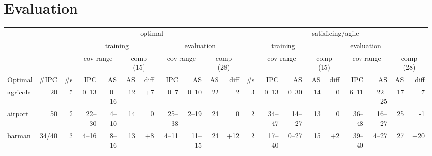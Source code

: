 \documentclass{article}
\begin{document}
        \tableofcontents
        \newpage \section{{Evaluation}}
                        \begin{table}[h] \centering \scriptsize \setlength{\tabcolsep}{2pt}
                        \begin{tabular}{l@{}rr|rrrr|rrrr|r|rrrr|rrrr}
& & \multicolumn{9}{c}{optimal} & \multicolumn{9}{c}{satisficing/agile} \\
\cmidrule[\lightrulewidth](){3-11}
\cmidrule[\lightrulewidth](l){12-20}
& & & \multicolumn{4}{c}{training} & \multicolumn{4}{c}{evaluation} & \multicolumn{4}{c}{training} & \multicolumn{4}{c}{evaluation}\\
\cmidrule[\lightrulewidth](){4-7}
\cmidrule[\lightrulewidth](l){8-11}
\cmidrule[\lightrulewidth](){13-16}
\cmidrule[\lightrulewidth](l){17-20}
& & & \multicolumn{2}{c}{cov range} & \multicolumn{2}{c}{comp (15)} & \multicolumn{2}{c}{cov range} & \multicolumn{2}{c}{comp (28)} & & \multicolumn{2}{c}{cov range} & \multicolumn{2}{c}{comp (15)} & \multicolumn{2}{c}{cov range} & \multicolumn{2}{c}{comp (28)} \\
\cmidrule[\lightrulewidth](){4-5}
\cmidrule[\lightrulewidth](l){6-7}
\cmidrule[\lightrulewidth](l){8-9}
\cmidrule[\lightrulewidth](l){10-11}
\cmidrule[\lightrulewidth](){13-14}
\cmidrule[\lightrulewidth](l){15-16}
\cmidrule[\lightrulewidth](l){17-18}
       Optimal &  \#IPC & \#s &      IPC &      AS &  AS &              diff &      IPC &      AS &  AS &               diff & \#s &       IPC &      AS &  AS &               diff &       IPC &      AS &  AS &               diff \\
\midrule
      agricola &     20 &   5 &    0--13 &   0--16 &  12 &  {\color{blue}+7} &     0--7 &   0--10 &  22 &    {\color{red}-2} &   3 &     0--13 &   0--30 &  14 &                  0 &     6--11 &  22--25 &  17 &    {\color{red}-7} \\
       airport &     50 &   2 &   22--30 &   4--10 &  14 &                 0 &   25--38 &   2--19 &  24 &                  0 &   2 &    34--47 &  14--27 &  13 &                  0 &    36--48 &  16--27 &  25 &    {\color{red}-1} \\
        barman &  34/40 &   3 &    4--16 &   8--16 &  13 &  {\color{blue}+8} &    4--11 &  11--15 &  24 &  {\color{blue}+12} &   2 &    17--40 &   0--27 &  15 &   {\color{blue}+2} &    39--40 &   4--27 &  27 &  {\color{blue}+20} \\

\end{tabular}
\end{table}
\end{document}

